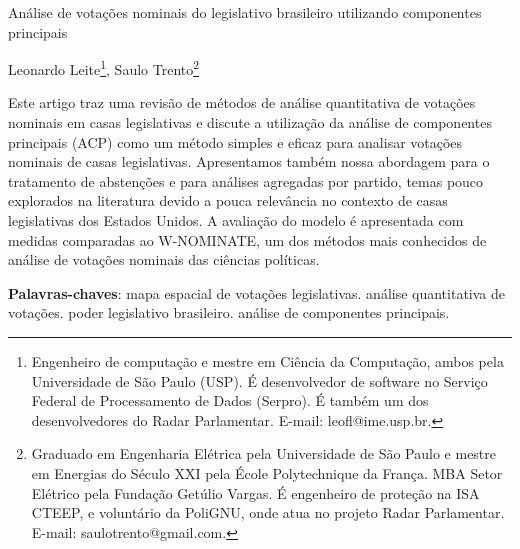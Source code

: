 \documentclass[
	article,			%
	12pt,				%
    twoside,			%
	a4paper,			%
	english,			%
	french,				%
	spanish,			%
	brazil,				%
	]{abntex2}
\newcommand\wnominate{W-NOMINATE\xspace}
\begin{document}
\frenchspacing 




\begin{center}
{\LARGE
Análise de votações nominais do legislativo brasileiro utilizando componentes principais
}
\end{center}




\begin{flushright}
Leonardo Leite\footnote{Engenheiro de computação e mestre em Ciência da Computação, ambos pela Universidade de São Paulo (USP). É desenvolvedor de software no Serviço Federal de Processamento de Dados (Serpro). É também um dos desenvolvedores do Radar Parlamentar. E-mail: leofl@ime.usp.br.}, Saulo Trento\footnote{Graduado em Engenharia Elétrica pela Universidade de São Paulo e mestre em Energias do Século XXI pela École Polytechnique da França. MBA Setor Elétrico pela Fundação Getúlio Vargas. É engenheiro de proteção na ISA CTEEP, e voluntário da PoliGNU, onde atua no projeto Radar Parlamentar. E-mail: saulotrento@gmail.com.}
\end{flushright}


\begin{resumo} 
\noindent
Este artigo traz uma revisão de métodos de análise quantitativa de votações nominais em casas legislativas e discute a utilização da análise de componentes principais (ACP) como um método simples e eficaz para analisar votações nominais de casas legislativas. Apresentamos também nossa abordagem para o tratamento de abstenções e para análises agregadas por partido, temas pouco explorados na literatura devido a pouca relevância no contexto de casas legislativas dos Estados Unidos. A avaliação do modelo é apresentada com medidas comparadas ao \wnominate, um dos métodos mais conhecidos de análise de votações nominais das ciências políticas.

 \vspace{\onelineskip}
    
 \noindent
 \textbf{Palavras-chaves}: mapa espacial de votações legislativas. análise quantitativa de votações. poder legislativo brasileiro. análise de componentes principais.
\end{resumo} 
\end{document}

